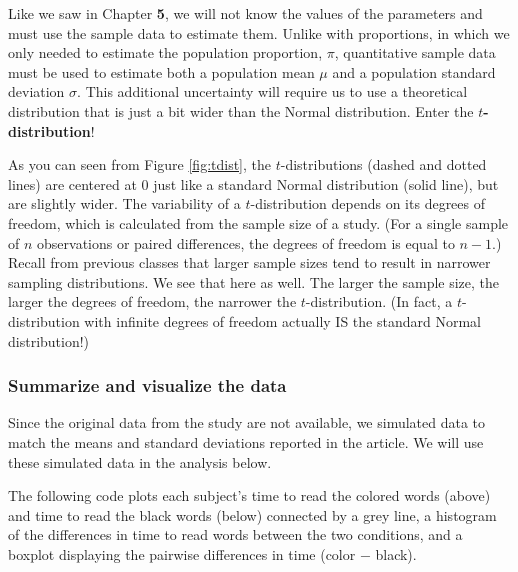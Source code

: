 \documentclass[
]{report}
\begin{document}
Like we saw in Chapter \textbf{5}, we will not know the values of the parameters and must use the sample data to estimate them. Unlike with proportions, in which we only needed to estimate the population proportion, \(\pi\), quantitative sample data must be used to estimate both a population mean \(\mu\) and a population standard deviation \(\sigma\). This additional uncertainty will require us to use a theoretical distribution that is just a bit wider than the Normal distribution. Enter the \textbf{\(t\)-distribution}!

As you can seen from Figure \ref{fig:tdist}, the \(t\)-distributions (dashed and dotted lines) are centered at 0 just like a standard Normal distribution (solid line), but are slightly wider. The variability of a \(t\)-distribution depends on its degrees of freedom, which is calculated from the sample size of a study. (For a single sample of \(n\) observations or paired differences, the degrees of freedom is equal to \(n-1\).) Recall from previous classes that larger sample sizes tend to result in narrower sampling distributions. We see that here as well. The larger the sample size, the larger the degrees of freedom, the narrower the \(t\)-distribution. (In fact, a \(t\)-distribution with infinite degrees of freedom actually IS the standard Normal distribution!)

\hypertarget{summarize-and-visualize-the-data-1}{%
\subsubsection*{Summarize and visualize the data}\label{summarize-and-visualize-the-data-1}}

Since the original data from the study are not available, we simulated data to match the means and standard deviations reported in the article. We will use these simulated data in the analysis below.

The following code plots each subject's time to read the colored words (above) and time to read the black words (below) connected by a grey line, a histogram of the differences in time to read words between the two conditions, and a boxplot displaying the pairwise differences in time (color \(-\) black).
\end{document}
